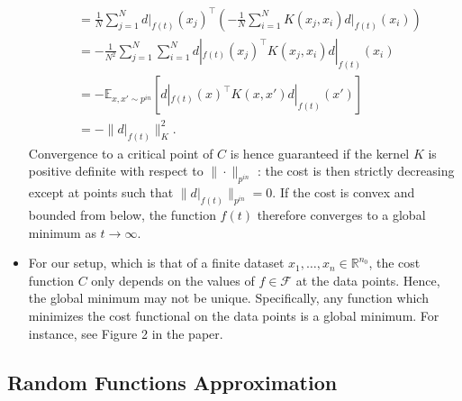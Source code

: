 \documentclass[10pt]{article}
\newcommand{\RR}{\mathbb{R}}
\newcommand{\EE}{\mathbb{E}}
\newcommand{\FF}{\mathcal{F}}
\newcommand{\pin}{{p^{in}}}
\begin{document}
\begin{itemize}
\begin{align*}
&= \frac{1}{N} \sum_{j = 1}^N d|_{f(t)}(x_j)^\top \left( -\frac{1}{N} \sum_{i = 1}^N K(x_j,x_i) d|_{f(t)}(x_i) \right) \\
&= -\frac{1}{N^2} \sum_{j = 1}^N \sum_{i = 1}^N d|_{f(t)}(x_j)^\top K(x_j,x_i) d|_{f(t)}(x_i) \\
&= - \EE_{x,x' \sim \pin} [d|_{f(t)}(x)^\top K(x,x') d|_{f(t)}(x')] \\
&= - \| d|_{f(t)} \|_K^2.
\end{align*}
Convergence to a critical point of $C$ is hence guaranteed if the kernel $K$ is positive definite with respect to $\|\cdot\|_{\pin}$ : the cost is then strictly decreasing except at points such that $\|d|_{f(t)}\|_{\pin} = 0$. If the cost is convex and bounded from below, the function $f(t)$ therefore converges to a global minimum as $t \rightarrow \infty$.
\item For our setup, which is that of a finite dataset $x_1, \ldots, x_n \in \RR^{n_0}$, the cost function $C$ only depends on the values of $f \in \FF$ at the data points. Hence, the global minimum may not be unique. Specifically, any function which minimizes the cost functional on the data points is a global minimum. For instance, see Figure 2 in the paper.
\end{itemize}

\newpage

\subsection{Random Functions Approximation}
\end{document}
